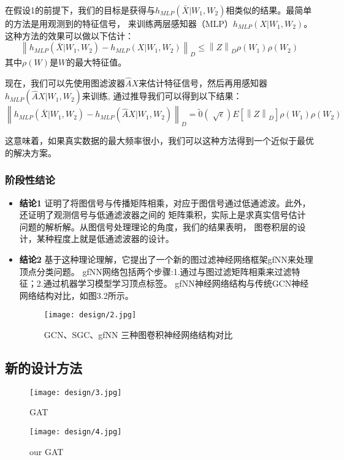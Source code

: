 在假设1的前提下，我们的目标是获得与$ h_{MLP}(\bar{X}|W_1,W_2) $相类似的结果。最简单的方法是用观测到的特征信号，
来训练两层感知器（MLP）$ h_{MLP}(X|W_1,W_2) $。这种方法的效果可以做以下估计：
$$  \left \| h_{MLP}(\bar{X}|W_1,W_2) - h_{MLP}(X|W_1,W_2) \right \|_{D}  \le  \left \| Z \right \|_{D} \rho(W_{1}) \rho(W_{2}) $$
其中$ \rho(W) $是$W$的最大特征值。

现在，我们可以先使用图滤波器$ \hat{A}X $来估计特征信号，然后再用感知器$ h_{MLP}(\hat{A}X|W_1,W_2) $来训练,
通过推导我们可以得到以下结果：
$$  \left \| h_{MLP}(\bar{X}|W_1,W_2) - h_{MLP}(\hat{A}X|W_1,W_2) \right \|_{D}  =  \tilde{0}(\sqrt[]{\epsilon }) E[\left \| Z \right \|_{D}] \rho(W_{1}) \rho(W_{2}) $$

这意味着，如果真实数据的最大频率很小，我们可以这种方法得到一个近似于最优的解决方案。

\subsubsection{阶段性结论}

\begin{itemize}
    \item \textbf{结论1} \quad
    证明了将图信号与传播矩阵相乘，对应于图信号通过低通滤波。此外，还证明了观测信号与低通滤波器之间的
    矩阵乘积，实际上是求真实信号估计问题的解析解。从图信号处理理论的角度，我们的结果表明，
    图卷积层的设计，某种程度上就是低通滤波器的设计。
    
    \item \textbf{结论2} \quad
    基于这种理论理解，它提出了一个新的图过滤神经网络框架gfNN来处理顶点分类问题。
    gfNN网络包括两个步骤:1.通过与图过滤矩阵相乘来过滤特征；2.通过机器学习模型学习顶点标签。
    gfNN神经网络结构与传统GCN神经网络结构对比，如图3.2所示。
    \begin{figure}[ht]
        \centering
        \captionsetup{width=10cm}
        \texttt{[image: design/2.jpg]}
        \caption{\label{3-2}GCN、SGC、gfNN 三种图卷积神经网络结构对比}
    \end{figure}
\end{itemize}

\subsection{新的设计方法}
\begin{figure}[htbp]
    \centering
    \begin{minipage}[t]{0.48\textwidth}
    \centering
    \captionsetup{width=5cm}
    \texttt{[image: design/3.jpg]}
    \caption{\label{3-3}GAT}
    \end{minipage}
    \begin{minipage}[t]{0.48\textwidth}
    \centering
    \captionsetup{width=5cm}
    \texttt{[image: design/4.jpg]}
    \caption{\label{3-4}our GAT}
    \end{minipage}
\end{figure}


